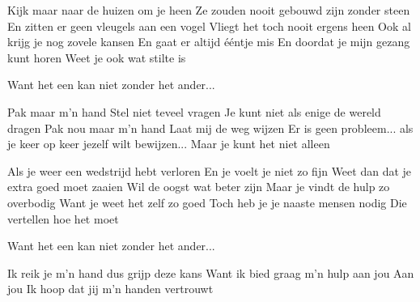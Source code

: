 \begin{verse*}
Kijk maar naar de huizen om je heen
Ze zouden nooit gebouwd zijn zonder steen
En zitten er geen vleugels aan een vogel
Vliegt het toch nooit ergens heen
Ook al krijg je nog zovele kansen
En gaat er altijd ééntje mis
En doordat je mijn gezang kunt horen
Weet je ook wat stilte is
\end{verse*}

\begin{verse*}
Want het een kan niet zonder het ander...
\end{verse*}

\begin{chorus}
Pak maar m'n hand
Stel niet teveel vragen
Je kunt niet als enige de wereld dragen
Pak nou maar m'n hand
Laat mij de weg wijzen
Er is geen probleem...
als je keer op keer jezelf wilt bewijzen...
Maar je kunt het niet alleen
\end{chorus}

\begin{verse*}
Als je weer een wedstrijd hebt verloren
En je voelt je niet zo fijn
Weet dan dat je extra goed moet zaaien
Wil de oogst wat beter zijn
Maar je vindt de hulp zo overbodig
Want je weet het zelf zo goed
Toch heb je je naaste mensen nodig
Die vertellen hoe het moet
\end{verse*}

\begin{verse*}
Want het een kan niet zonder het ander...
\end{verse*}

\thechorus

\begin{verse*}
Ik reik je m'n hand dus grijp deze kans
Want ik bied graag m'n hulp aan jou
Aan jou
Ik hoop dat jij m'n handen vertrouwt
\end{verse*}

\thechorus
